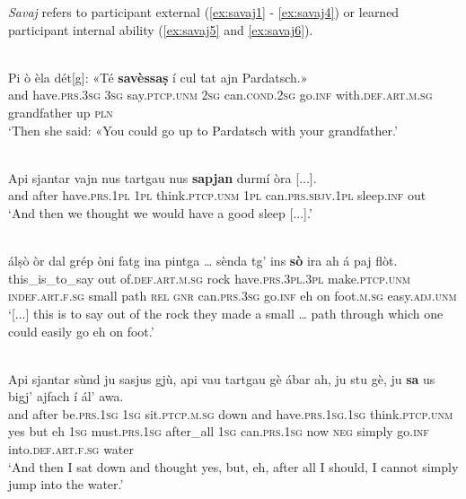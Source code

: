 \textit{Savaj} refers to participant external (\ref{ex:savaj1} - \ref{ex:savaj4}) or learned participant internal ability (\ref{ex:savaj5} and \ref{ex:savaj6}). 

\ea
\label{ex:savaj1}
\\
\gll  Pi ò èla dét[g]: «Té \textbf{savèssaṣ} í cul tat ajn Pardatsch.»  \\
and have.\textsc{prs.3sg} \textsc{3sg} say.\textsc{ptcp.unm} \textsc{2sg} can.\textsc{cond.2sg} go.\textsc{inf} with.\textsc{def.art.m.sg} grandfather up \textsc{pln}  \\
\glt `Then she said: «You could go up to Pardatsch with your grandfather.'
\z

\ea
\label{ex:savaj2}
\\
\gll    Api sjantar vajn nus tartgau nus \textbf{sapjan} durmí òra [...].\\
and after have.\textsc{prs.1pl} \textsc{1pl} think.\textsc{ptcp.unm} \textsc{1pl}  can.\textsc{prs.sbjv.1pl} sleep.\textsc{inf} out\\
\glt `And then we thought we would have a good sleep [...].'
\z

\ea
\label{ex:savaj3}
\\
\gll  [...] álṣò òr dal grép òni fatg ina pintga …  sènda tg’ ins \textbf{sò} ira ah á paj flòt.\\
{} this\_is\_to\_say out of.\textsc{def.art.m.sg} rock have.\textsc{prs.3pl.3pl} make.\textsc{ptcp.unm} \textsc{indef.art.f.sg} small {} path \textsc{rel} \textsc{gnr} can.\textsc{prs.3sg} go.\textsc{inf} eh on foot.\textsc{m.sg} easy.\textsc{adj.unm} \\
\glt `[...] this is to say out of the rock they made a small … path through which one could easily go eh on foot.'
\z


\ea
\label{ex:savaj4}
\\
\gll  Api sjantar sùnd ju sasjus gjù, api vau tartgau gè ábar ah, ju stu gè, ju \textbf{sa} us bigj’ ajfach í ál’ awa.\\
and after be.\textsc{prs.1sg} \textsc{1sg} sit.\textsc{ptcp.m.sg} down and have.\textsc{prs.1sg.1sg} think.\textsc{ptcp.unm} yes but eh \textsc{1sg} must.\textsc{prs.1sg} after\_all \textsc{1sg} can.\textsc{prs.1sg} now \textsc{neg} simply go.\textsc{inf} into.\textsc{def.art.f.sg} water\\
\glt `And then I sat down and thought yes, but, eh, after all I should, I cannot simply jump into the water.'
\z                                       

